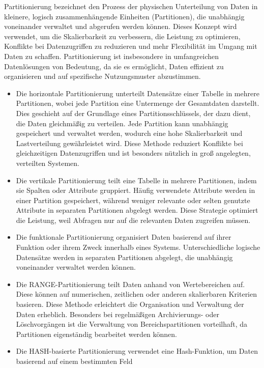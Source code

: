 Partitionierung bezeichnet den Prozess der physischen Unterteilung von Daten in kleinere, logisch zusammenhängende
Einheiten (Partitionen), die unabhängig voneinander verwaltet und abgerufen werden können.
Dieses Konzept wird verwendet, um die Skalierbarkeit zu verbessern, die Leistung zu optimieren, Konflikte
bei Datenzugriffen zu reduzieren und mehr Flexibilität im Umgang mit Daten zu schaffen.
Partitionierung ist insbesondere in umfangreichen Datenlösungen von Bedeutung, da sie es ermöglicht,
Daten effizient zu organisieren und auf spezifische Nutzungsmuster abzustimmen.

\begin{itemize}
    \item Die horizontale Partitionierung unterteilt Datensätze einer Tabelle in mehrere Partitionen,
wobei jede Partition eine Untermenge der Gesamtdaten darstellt.
Dies geschieht auf der Grundlage eines Partitionsschlüssels, der dazu dient, die Daten gleichmäßig zu verteilen.
Jede Partition kann unabhängig gespeichert und verwaltet werden, wodurch eine hohe Skalierbarkeit und Lastverteilung gewährleistet wird.
Diese Methode reduziert Konflikte bei gleichzeitigen Datenzugriffen und ist besonders nützlich in groß angelegten, verteilten Systemen.
    \item Die vertikale Partitionierung teilt eine Tabelle in mehrere Partitionen, indem sie Spalten oder Attribute gruppiert.
Häufig verwendete Attribute werden in einer Partition gespeichert, während weniger relevante oder selten genutzte Attribute
in separaten Partitionen abgelegt werden. Diese Strategie optimiert die Leistung, weil Abfragen nur auf die relevanten Daten zugreifen müssen.
    \item Die funktionale Partitionierung organisiert Daten basierend auf ihrer Funktion oder ihrem Zweck innerhalb eines Systems.
Unterschiedliche logische Datensätze werden in separaten Partitionen abgelegt, die unabhängig voneinander verwaltet werden können.
    \item Die RANGE-Partitionierung teilt Daten anhand von Wertebereichen auf.
Diese können auf numerischen, zeitlichen oder anderen skalierbaren Kriterien basieren.
Diese Methode erleichtert die Organisation und Verwaltung der Daten erheblich.
Besonders bei regelmäßigen Archivierungs- oder Löschvorgängen ist die Verwaltung von Bereichspartitionen vorteilhaft,
da Partitionen eigenständig bearbeitet werden können.
    \item Die HASH-basierte Partitionierung verwendet eine Hash-Funktion, um Daten basierend auf einem bestimmten Feld

\end{itemize}
